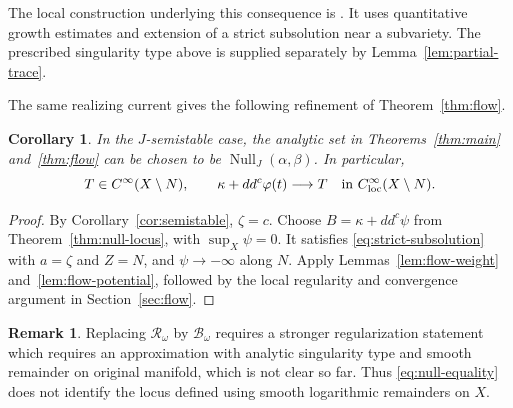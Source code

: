 \documentclass[reqno]{amsart}
\numberwithin{equation}{section}
\newtheorem{corollary}[theorem]{Corollary}
\theoremstyle{definition}
\newtheorem{remark}[theorem]{Remark}
\DeclareMathOperator{\Null}{Null}
\newcommand{\ddc}{dd^c}
\begin{document}
The local construction underlying this consequence is
\cite[Proposition~5.4 and the proof of Theorem~5.1]{FM26}.
It uses quantitative growth estimates and extension of a
strict subsolution near a subvariety. The prescribed
singularity type above is supplied separately by
Lemma~\ref{lem:partial-trace}.

The same realizing current gives the following refinement
of Theorem~\ref{thm:flow}.

\begin{corollary}\label{cor:null-flow}
In the $J$-semistable case, the analytic set in
Theorems~\ref{thm:main} and~\ref{thm:flow} can be chosen to be
$\Null_J(\alpha,\beta)$. In particular,
\[
 T\in C^\infty(X\setminus N),\qquad
 \kappa+\ddc\varphi(t)\longrightarrow T
 \quad\text{in }C^\infty_{\rm loc}(X\setminus N).
\]
\end{corollary}
\begin{proof}
By Corollary~\ref{cor:semistable}, $\zeta=c$.
Choose $B=\kappa+\ddc\psi$ from Theorem~\ref{thm:null-locus},
with $\sup_X\psi=0$. It satisfies
\eqref{eq:strict-subsolution} with $a=\zeta$ and $Z=N$, and
$\psi\to-\infty$ along $N$.
Apply Lemmas~\ref{lem:flow-weight} and~\ref{lem:flow-potential},
followed by the local regularity and convergence argument in
Section~\ref{sec:flow}.
\end{proof}


\begin{remark}
    Replacing $\mathcal R_\omega$ by $\mathcal B_\omega$ requires
a stronger regularization statement which requires an approximation with analytic singularity type and smooth remainder on original manifold, which is not clear so far. Thus
\eqref{eq:null-equality} does not identify the locus defined
using smooth logarithmic remainders on $X$.
\end{remark}



\printbibliography
\end{document}
